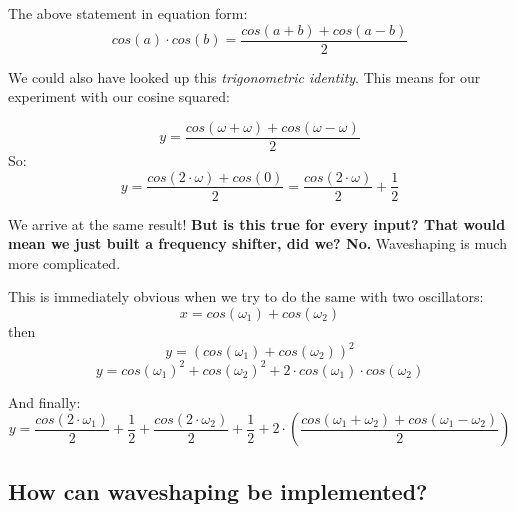 The above statement in equation form:
\begin{equation}
	cos(a)\cdot cos(b) = \frac{cos(a+b) + cos(a-b)}{2}
\end{equation}

We could also have looked up this \textit{trigonometric identity}.
This means for our experiment with our cosine squared:

\begin{equation}
y = \frac{cos(\omega+\omega) + cos(\omega-\omega)}{2}
\end{equation}
So:
\begin{equation}
y = \frac{cos(2 \cdot \omega) + cos(0)}{2} = \frac{cos(2 \cdot \omega )}{2}+\frac{1}{2}
\end{equation}

We arrive at the same result!
\textbf{But is this true for every input? That would mean we just built a frequency shifter, did we? No.} Waveshaping is much more complicated.\\

\begin{mdframed}[backgroundcolor=black!10,rightline=false,leftline=false]

This is immediately obvious when we try to do the same with two oscillators:
\begin{equation}
x = cos(\omega_1)+cos(\omega_2)
\end{equation}
then
\begin{equation}
y = (cos(\omega_1)+cos(\omega_2) ) ^2
\end{equation}
\begin{equation}
y = cos(\omega_1)^2+cos(\omega_2)^2+2\cdot cos(\omega_1) \cdot cos(\omega_2)
\end{equation}

And finally:
\begin{equation}
	y = \frac{cos(2 \cdot \omega_1)}{2} + \frac{1}{2} + \frac{cos(2 \cdot \omega_2)}{2} +\frac{1}{2} + 2 \cdot (\frac{cos(\omega_1+\omega_2) + cos(\omega_1-\omega_2)}{2})
\end{equation}


\end{mdframed}

\subsection{How can waveshaping be implemented?} %
\label{sub:how_can_waveshaping_be_implemented_}


